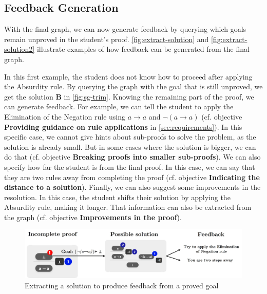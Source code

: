 \subsection{Feedback Generation}
With the final graph, we can now generate feedback by querying which goals remain unproved in the student's proof. \autoref{fig:extract-solution} and \autoref{fig:extract-solution2} illustrate examples of how feedback can be generated from the final graph.

In this first example, the student does not know how to proceed after applying the Absurdity rule. By querying the  graph with the goal that is still unproved, we get the solution \textbf{B} in \autoref{fig:sg-trim}. Knowing the remaining part of the proof, we can generate feedback. For example, we can tell the student to apply the Elimination of the Negation rule using \(a \to a \) and  \(\lnot(a \to a) \) (cf. objective \textbf{Providing guidance on rule applications} in \autoref{sec:requirements}). In this specific case, we cannot give hints about sub-proofs to solve the problem, as the solution is already small. But in some cases where the solution is bigger, we can do that (cf. objective \textbf{Breaking proofs into smaller sub-proofs}). We can also specify how far the student is from the final proof. In this case, we can say that they are two rules away from completing the proof (cf. objective \textbf{Indicating the distance to a solution}). Finally, we can also suggest some improvements in the resolution. In this case, the student shifts their solution by applying the Absurdity rule, making it longer. That information can also be extracted from the graph (cf. objective \textbf{Improvements in the proof}).

\begin{figure}[t]
    \centering
    \includegraphics[width=1\linewidth]{resources/trim-pos-feed.jpg}
    \caption{Extracting a solution to produce feedback from a proved goal}
    \label{fig:extract-solution}
\end{figure}

